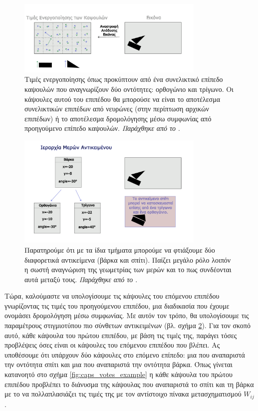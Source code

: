 \begin{figure}[p]
  \centering
  \includegraphics[width=0.8\textwidth]{images/chapter theoritical background/caps_vectors_gr.pdf}
  \caption{Τιμές ενεργοποίησης όπως προκύπτουν από ένα συνελικτικό επίπεδο καψουλών που αναγνωρίζουν δύο οντότητες: ορθογώνιο και τρίγωνο. Οι κάψουλες αυτού του επιπέδου θα μπορούσε να είναι το αποτέλεσμα συνελικτικών επιπέδων από νευρώνες (στην περίπτωση αρχικών επιπέδων) ή το αποτέλεσμα δρομολόγησης μέσω συμφωνίας από προηγούμενο επίπεδο καψουλών. \textit{Παράχθηκε από το \href{https://inkscape.org/}{}}.}
  \label{fig:caps_vectors}
\end{figure}

\begin{figure}[p]
  \centering
  \includegraphics[width=0.8\textwidth]{images/chapter theoritical background/tree_of_objects_gr.pdf}
  \caption{Παρατηρούμε ότι με τα ίδια τμήματα μπορούμε να φτιάξουμε δύο διαφορετικά αντικείμενα (βάρκα και σπίτι). Παίζει μεγάλο ρόλο λοιπόν η σωστή αναγνώριση της γεωμετρίας των μερών και το πως συνδέονται αυτά μεταξύ τους. \textit{Παράχθηκε από το \href{https://inkscape.org/}{}}.}
  \label{fig:caps_tree}
\end{figure}

Τώρα, καλούμαστε να υπολογίσουμε τις κάψουλες του επόμενου επιπέδου γνωρίζοντας τις τιμές του προηγούμενου επιπέδου, μια διαδικασία που έχουμε ονομάσει δρομολόγηση μέσω συμφωνίας. Με αυτόν τον τρόπο, θα υπολογίσουμε τις παραμέτρους στιγμιοτύπου πιο σύνθετων αντικειμένων (βλ. σχήμα \ref{fig:caps_tree}). Για τον σκοπό αυτό, κάθε κάψουλα του πρώτου επιπέδου, με βάση τις τιμές της, παράγει τόσες προβλέψεις όσες είναι οι κάψουλες του επόμενου επιπέδου που βλέπει. Ας υποθέσουμε ότι υπάρχουν δύο κάψουλες στο επόμενο επίπεδο: μια που αναπαριστά την οντότητα σπίτι και μια που αναπαριστά την οντότητα βάρκα. Όπως γίνεται κατανοητό στο σχήμα \ref{fig:caps_votes_example} η κάθε κάψουλα του πρώτου επιπέδου προβλέπει το διάνυσμα της κάψουλας που αναπαριστά το σπίτι και τη βάρκα με το να πολλαπλασιάζει τις τιμές της με τον αντίστοιχο πίνακα μετασχηματισμού $W_{ij}$. \par

